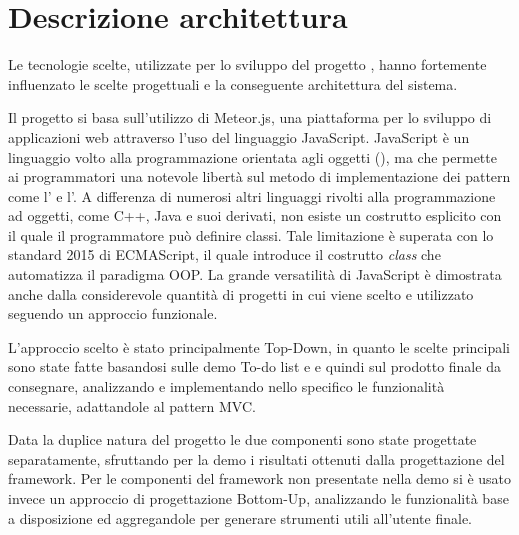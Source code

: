 \section{Descrizione architettura}
Le tecnologie scelte, utilizzate per lo sviluppo del progetto \ProjectName{}, hanno fortemente influenzato le scelte progettuali e la conseguente architettura del sistema.

Il progetto si basa sull'utilizzo di Meteor.js, una piattaforma per lo sviluppo di applicazioni web attraverso l'uso del linguaggio JavaScript. JavaScript è un linguaggio volto alla programmazione orientata agli oggetti (), ma che permette ai programmatori una notevole libertà sul metodo di implementazione dei pattern come l' e l'. A differenza di numerosi altri linguaggi rivolti alla programmazione ad oggetti, come C++, Java e suoi derivati, non esiste un costrutto esplicito con il quale il programmatore può definire classi. Tale limitazione è superata con lo standard 2015 di ECMAScript, il quale introduce il costrutto \textit{class} che automatizza il paradigma OOP. La grande versatilità di JavaScript è dimostrata anche dalla considerevole quantità di progetti in cui viene scelto e utilizzato seguendo un approccio funzionale.

L'approccio scelto è stato principalmente Top-Down, in quanto le scelte principali sono state fatte basandosi sulle demo To-do list e \DemoName{} e quindi sul prodotto finale da consegnare, analizzando e implementando nello specifico le funzionalità necessarie, adattandole al pattern MVC.

Data la duplice natura del progetto le due componenti sono state progettate separatamente, sfruttando per la demo i risultati ottenuti dalla progettazione del framework. Per le componenti del framework non presentate nella demo si è usato invece un approccio di progettazione Bottom-Up, analizzando le funzionalità base a disposizione ed aggregandole per generare strumenti utili all'utente finale.